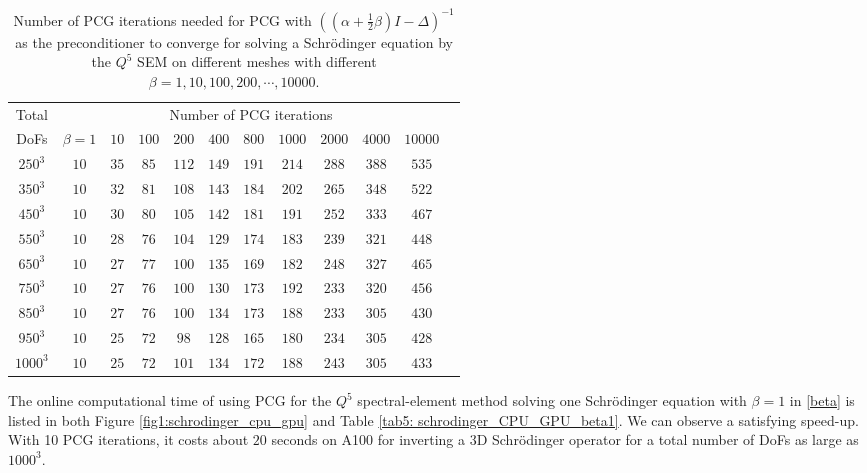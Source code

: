 \documentclass{article}
\begin{document}
\begin{table}[ht!]
    \centering
    \begin{tabular}{|c|c|c|c|c|c|c|c|c|c|c|c|}
    \hline
    Total&\multicolumn{10}{c|}{Number of PCG iterations}\\
    \cline{2-11}
        DoFs   & $\beta=1$  & $10$ & $100$& $200$& $400$ & $800$ & $1000$& $2000$& $4000$& $10000$\\
    \hline
          $250^3$ & $10$ & $35$ & $85$ & $112$& $149$ & $191$ & $214$ & $288$ & $388$ & $535$\\
    \hline
          $350^3$ & $10$ & $32$ & $81$ & $108$ & $143$ & $184$ & $202$ & $265$ & $348$ & $522$ \\
    \hline
          $450^3$ & $10$ & $30$ & $80$ & $105$ & $142$ & $181$ & $191$ & $252$ & $333$ & $467$ \\
    \hline
          $550^3$ & $10$ & $28$ & $76$ & $104$ & $129$ & $174$ & $183$ & $239$ & $321$ & $448$ \\
    \hline
          $650^3$ & $10$ & $27$ & $77$ & $100$ & $135$ & $169$ & $182$ & $248$ & $327$ & $465$ \\
    \hline
          $750^3$ & $10$ & $27$ & $76$ & $100$ & $130$ & $173$ & $192$ & $233$ & $320$ & $456$ \\
    \hline
          $850^3$ & $10$ & $27$ & $76$ & $100$ & $134$ & $173$ & $188$ & $233$ & $305$ & $430$ \\
    \hline
          $950^3$ & $10$ & $25$ & $72$ & $98$ & $128$ & $165$ & $180$ & $234$ & $305$ & $428$\\
    \hline
          $1000^3$ & $10$ & $25$ & $72$ & $101$ & $134$ & $172$ & $188$ & $243$ & $305$ & $433$\\
    \hline
    \end{tabular}
    \caption{Number of PCG iterations needed for PCG with $((\alpha+\frac{1}{2}\beta)I - \Delta)^{-1}$ as the preconditioner to converge for   solving a Schr{\"o}dinger equation by the $Q^5$ SEM on different meshes with different $\beta=1,10,100,200,\cdots, 10000$.}
    \label{tab7c: schrodinger_iter}
\end{table}

The online computational time of using PCG for the $Q^5$ spectral-element method solving one  Schr{\"o}dinger equation with $\beta=1$ in \eqref{beta} is listed in both Figure \ref{fig1:schrodinger_cpu_gpu} and Table \ref{tab5: schrodinger_CPU_GPU_beta1}. We can observe a satisfying speed-up. With 10 PCG iterations, it  costs about $20$ seconds on A100 for inverting a 3D Schr{\"o}dinger operator for a total number of DoFs as large as $1000^3$.
\end{document}
